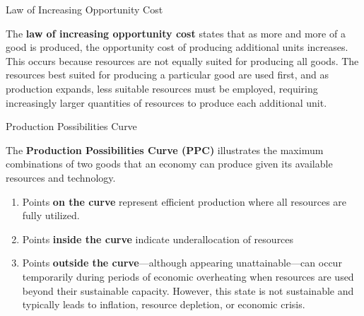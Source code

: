 \documentclass[10pt]{article}
\begin{document}
  \begin{core}{Law of Increasing Opportunity Cost}

    The \textbf{law of increasing opportunity cost} states that as more and more of a good is produced, the opportunity cost of producing additional units increases. This occurs because resources are not equally suited for producing all goods. The resources best suited for producing a particular good are used first, and as production expands, less suitable resources must be employed, requiring increasingly larger quantities of resources to produce each additional unit.

  \end{core}

  \begin{core}[label=core:ppc]{Production Possibilities Curve}

    The \textbf{Production Possibilities Curve (PPC)} illustrates the maximum combinations of two goods that an economy can produce given its available resources and technology. 


    \begin{enumerate}

      \item Points \textbf{on the curve} represent efficient production where all resources are fully utilized. 

      \item Points \textbf{inside the curve} indicate underallocation of resources

      \item Points \textbf{outside the curve}---although appearing unattainable---can occur temporarily during periods of economic overheating when resources are used beyond their sustainable capacity. However, this state is not sustainable and typically leads to inflation, resource depletion, or economic crisis.


\end{enumerate}
\end{core}
\end{document}
